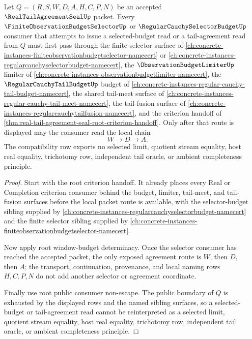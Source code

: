 \begin{theorem}
\label{thm:real-tail-agreement-seal-root-selector-budget-compatibility}
Let $Q=(R,S,W,D,A,H,C,P,N)$ be an accepted $\RealTailAgreementSealUp$ packet. Every $\FiniteObservationBudgetSelectorUp$ or $\RegularCauchySelectorBudgetUp$ consumer that attempts to issue a selected-budget read or a tail-agreement read from $Q$ must first pass through the finite selector surface of \autoref{ch:concrete-instances-finiteobservationbudgetselector-namecert} or \autoref{ch:concrete-instances-regularcauchyselectorbudget-namecert}, the $\ObservationBudgetLimiterUp$ limiter of \autoref{ch:concrete-instances-observationbudgetlimiter-namecert}, the $\RegularCauchyTailBudgetUp$ budget of \autoref{ch:concrete-instances-regular-cauchy-tail-budget-namecert}, the shared tail-meet surface of \autoref{ch:concrete-instances-regular-cauchy-tail-meet-namecert}, the tail-fusion surface of \autoref{ch:concrete-instances-regularcauchytailfusion-namecert}, and the criterion handoff of \autoref{thm:real-tail-agreement-seal-root-criterion-handoff}. Only after that route is displayed may the consumer read the local chain
$$
W \to D \to A.
$$
The compatibility row exports no selected limit, quotient stream equality, host real equality, trichotomy row, independent tail oracle, or ambient completeness principle.
\end{theorem}
\begin{proof}
Start with the root criterion handoff. It already places every Real or Completion criterion consumer behind the budget, limiter, tail-meet, and tail-fusion surfaces before the local packet route is available, with the selector-budget sibling supplied by \autoref{ch:concrete-instances-regularcauchyselectorbudget-namecert} and the finite selector sibling supplied by \autoref{ch:concrete-instances-finiteobservationbudgetselector-namecert}.

Now apply root window-budget determinacy. Once the selector consumer has reached the accepted packet, the only exposed agreement route is $W$, then $D$, then $A$; the transport, continuation, provenance, and local naming rows $H,C,P,N$ do not add another selector or agreement coordinate.

Finally use root public consumer non-escape. The public boundary of $Q$ is exhausted by the displayed rows and the named sibling surfaces, so a selected-budget or tail-agreement read cannot be reinterpreted as a selected limit, quotient stream equality, host real equality, trichotomy row, independent tail oracle, or ambient completeness principle.
\end{proof}

